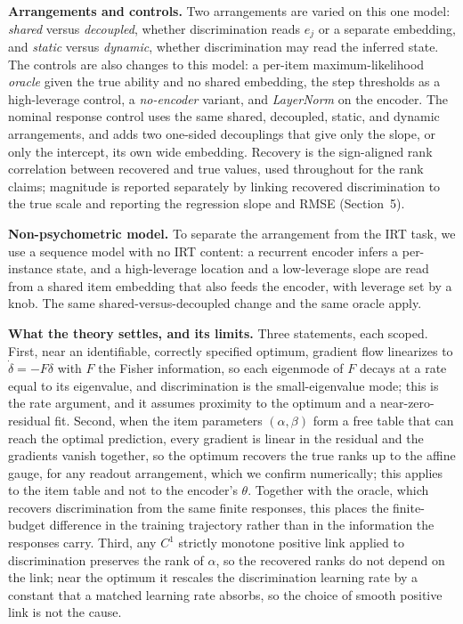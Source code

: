 \documentclass[twocolumn,10pt]{article}
\begin{document}
\textbf{Arrangements and controls.} Two arrangements are varied on this one model:
\emph{shared} versus \emph{decoupled}, whether discrimination reads $e_j$ or a separate
embedding, and \emph{static} versus \emph{dynamic}, whether discrimination may read the inferred
state. The controls are also changes to this model: a per-item maximum-likelihood
\emph{oracle} given the true ability and no shared embedding, the step thresholds as a
high-leverage control, a \emph{no-encoder} variant, and \emph{LayerNorm} on the encoder.
The nominal response control uses the same shared, decoupled, static, and dynamic
arrangements, and adds two one-sided decouplings that give only the slope, or only the
intercept, its own wide embedding. Recovery is the sign-aligned rank correlation between
recovered and true values, used throughout for the rank claims; magnitude is reported
separately by linking recovered discrimination to the true scale and reporting the
regression slope and RMSE (Section~5).

\textbf{Non-psychometric model.} To separate the arrangement from the IRT task, we use a
sequence model with no IRT content: a recurrent encoder infers a per-instance state, and a
high-leverage location and a low-leverage slope are read from a shared item embedding that also
feeds the encoder, with leverage set by a knob. The same shared-versus-decoupled change and
the same oracle apply.

\textbf{What the theory settles, and its limits.} Three statements, each scoped. First, near
an identifiable, correctly specified optimum, gradient flow linearizes to $\dot\delta=-F\delta$
with $F$ the Fisher information, so each eigenmode of $F$ decays at a rate equal to its
eigenvalue, and discrimination is the small-eigenvalue mode; this is the rate argument, and
it assumes proximity to the optimum and a near-zero-residual fit. Second, when the item
parameters $(\alpha,\beta)$ form a free table that can reach the optimal prediction, every
gradient is linear in the residual and the gradients vanish together, so the optimum
recovers the true ranks up to the affine gauge, for any readout arrangement, which we
confirm numerically; this applies to the item table and not to the encoder's $\theta$.
Together with the oracle, which recovers discrimination from the same finite responses,
this places the finite-budget difference in the training trajectory rather than in the
information the responses carry. Third, any $C^1$ strictly monotone positive link applied to
discrimination preserves the rank of $\alpha$, so the recovered ranks do not depend on the
link; near the optimum it rescales the discrimination learning rate by a constant that a
matched learning rate absorbs, so the choice of smooth positive link is not the cause.
\end{document}
